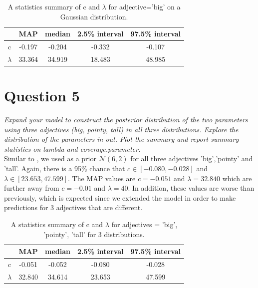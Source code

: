 \documentclass[11pt,a4paper,oneside]{article}
\begin{document}

\begin{table}[ht]
\centering
\begin{tabular}{ccccc}
  \hline
  & MAP & median & 2.5\% interval & 97.5\% interval\\ 
  \hline
    c & -0.197 & -0.204 & -0.332 & -0.107\\ 
    $\lambda$ & 33.364 & 34.919 & 18.483 & 48.985\\ 
   \hline
\end{tabular}
\caption{A statistics summary of c and $\lambda$ for adjective='big' on a Gaussian distribution.}
\label{question_4}
\end{table}


\section{Question 5}
\label{Q5}
\textit{Expand your model to construct the posterior distribution of the two parameters using three adjectives (big, pointy, tall) in all three distributions. Explore the distribution of the parameters in out. Plot the summary and report summary statistics on lambda and coverage.parameter.}\\

Similar to , we used as a prior $\mathcal{N}(6, 2)$ for all three adjectives 'big','pointy' and 'tall'. Again, there is a 95\% chance that $ c \in [-0.080, -0.028]$ and $\lambda \in [23.653, 47.599]$. The MAP values are $c = -0.051$ and $\lambda = 32.840$ which are further away from $c = -0.01$ and $\lambda = 40$. In addition, these values are worse than previously, which is expected since we extended the model in order to make predictions for 3 adjectives that are different.

\begin{table}[ht]
\centering
\begin{tabular}{ccccc}
  \hline
  & MAP & median & 2.5\% interval & 97.5\% interval\\ 
  \hline
    c & -0.051 & -0.052 & -0.080 & -0.028\\ 
    $\lambda$ & 32.840 & 34.614 & 23.653 & 47.599\\ 
   \hline
\end{tabular}
\caption{A statistics summary of c and $\lambda$ for adjectives = 'big', 'pointy', 'tall' for 3 distributions.}
\label{question_5}
\end{table}
\end{document}
